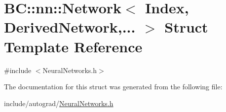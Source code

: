 \hypertarget{structBC_1_1nn_1_1Network}{}\section{BC\+:\+:nn\+:\+:Network$<$ Index, Derived\+Network,... $>$ Struct Template Reference}
\label{structBC_1_1nn_1_1Network}


{\ttfamily \#include $<$Neural\+Networks.\+h$>$}



The documentation for this struct was generated from the following file\+:\begin{DoxyCompactItemize}
\item 
include/autograd/\hyperlink{autograd_2NeuralNetworks_8h}{Neural\+Networks.\+h}\end{DoxyCompactItemize}
